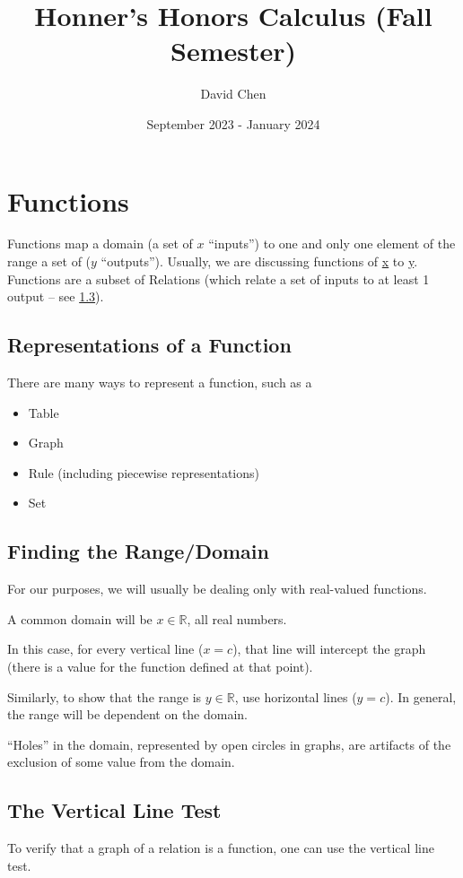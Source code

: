 \documentclass{article}
\title{Honner's Honors Calculus (Fall Semester)}
\author{David Chen}
\date{September 2023 - January 2024}
\begin{document}
\maketitle

\section{Functions}
Functions map a domain (a set of $x$ ``inputs'') to one and only one element of the range a set of ($y$ ``outputs''). Usually, we are discussing functions of \underline{x} to \underline{y}.
Functions are a subset of Relations (which relate a set of inputs to at least 1 output -- see \ref{vertical-line}).

\subsection{Representations of a Function}
There are many ways to represent a function, such as a
\begin{itemize}
    \item Table
    \item Graph
    \item Rule (including piecewise representations)
    \item Set
\end{itemize}

\subsection{Finding the Range/Domain}
For our purposes, we will usually be dealing only with real-valued functions.

A common domain will be $x \in \mathbb{R}$, all real numbers.

In this case, for every vertical line ($x=c$), that line will intercept the graph (there is a value for the function defined at that point).

Similarly, to show that the range is $y \in \mathbb{R}$, use horizontal lines ($y=c$). In general, the range will be dependent on the domain.

``Holes'' in the domain, represented by open circles in graphs, are artifacts of the exclusion of some value from the domain.

\subsection{The Vertical Line Test} \label{vertical-line}
To verify that a graph of a relation is a function, one can use the vertical line test.
\end{document}
